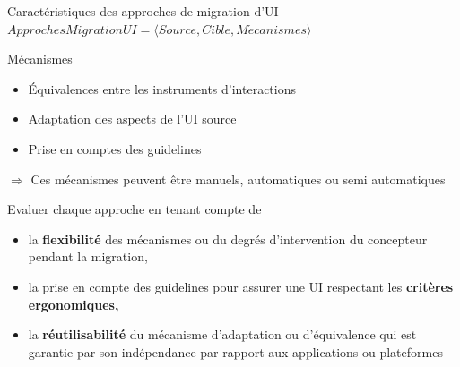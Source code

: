 \documentclass[11pt]{beamer}
\begin{document}
\begin{frame}[t]{Caractéristiques des approches de migration d'UI}
$Approches Migration UI = \langle Source, Cible, M\acute ecanismes\rangle$
\pause
\begin{block}{Mécanismes }
\begin{itemize}
\item {\scriptsize Équivalences entre les instruments d'interactions}
\item {\scriptsize Adaptation des aspects de l'UI source} 
\item {\scriptsize Prise en comptes des guidelines}
\end{itemize}
{\tiny $\Rightarrow$ Ces mécanismes peuvent être manuels, automatiques ou semi automatiques}
\end{block}
\pause
\begin{block}{Evaluer chaque approche en tenant compte de }
\begin{itemize}
\item {\scriptsize la \textbf{flexibilité} des mécanismes ou du degrés d'intervention du concepteur pendant la migration, }
\item {\scriptsize la prise en compte des guidelines pour assurer une UI respectant les\textbf{ critères ergonomiques,}~\cite{Vanderdonckt1997}}
\item {\scriptsize la \textbf{réutilisabilité} du mécanisme d'adaptation ou d'équivalence qui est garantie par son indépendance par rapport aux applications ou plateformes}
\end{itemize}
\end{block}


\end{frame}
\end{document}
